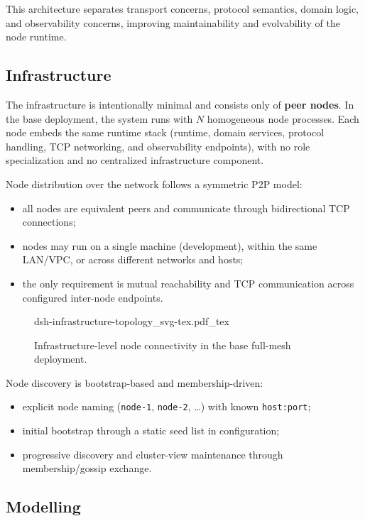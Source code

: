 This architecture separates transport concerns, protocol semantics, domain logic, and observability concerns, improving maintainability and evolvability of the node runtime.
\subsection{Infrastructure}\label{infrastructure}

The infrastructure is intentionally minimal and consists only of \textbf{peer nodes}. In the base deployment, the system runs with \(N\) homogeneous node processes. Each node embeds the same runtime stack (runtime, domain services, protocol handling, TCP networking, and observability endpoints), with no role specialization and no centralized infrastructure component.

Node distribution over the network follows a symmetric P2P model:
\begin{itemize}
  \item all nodes are equivalent peers and communicate through bidirectional TCP connections;
  \item nodes may run on a single machine (development), within the same LAN/VPC, or across different networks and hosts;
  \item the only requirement is mutual reachability and TCP communication across configured inter-node endpoints.
\end{itemize}

\begin{figure}[htbp]
  \centering
  \def\svgwidth{0.82\textwidth}
  {dsh-infrastructure-topology_svg-tex.pdf_tex}
  \caption{Infrastructure-level node connectivity in the base full-mesh deployment.}
  \label{fig:dsh-infrastructure-topology}
\end{figure}

Node discovery is bootstrap-based and membership-driven:
\begin{itemize}
  \item explicit node naming (\texttt{node-1}, \texttt{node-2}, \ldots) with known \texttt{host:port};
  \item initial bootstrap through a static seed list in configuration;
  \item progressive discovery and cluster-view maintenance through membership/gossip exchange.
\end{itemize}
\subsection{Modelling}\label{modelling}

